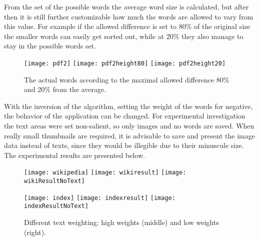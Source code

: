 \documentclass[draft,final]{vutinfth} %
\begin{document}
	From the set of the possible words the average word size is calculated, but after then it is still further customizable how much the words are allowed to vary from this value.
	For example if the allowed difference is set to 80\% of the original size the smaller words can easily get sorted out, while at 20\% they also manage to stay in the possible words set.\par 
	\begin{figure}[H]
		\texttt{[image: pdf2]}\hfill
		\texttt{[image: pdf2height80]}\hfill
		\texttt{[image: pdf2height20]}
		\caption{The actual words according to the maximal allowed difference 80\% and 20\% from the average.  }
	\end{figure}  
	With the inversion of the algorithm, setting the weight of the words for negative, the behavior of the application can be changed.
	For experimental investigation the text areas were set non-salient, so only images and no words are saved. 
	When really small thumbnails are required, it  is advisable to save and present the image data instead of texts, since they would be illegible due to their minuscule size.  
	The experimental results are presented below.
	\begin{figure}[H]		
		\texttt{[image: wikipedia]}\hfill
		\texttt{[image: wikiresult]}\hfill
		\texttt{[image: wikiResultNoText]}
	
		\texttt{[image: index]}\hfill
		\texttt{[image: indexresult]}\hfill
		\texttt{[image: indexResultNoText]}
	
		\caption{Different text weighting: high weights (middle) and low weights (right).  }
	\end{figure} 
\end{document}
